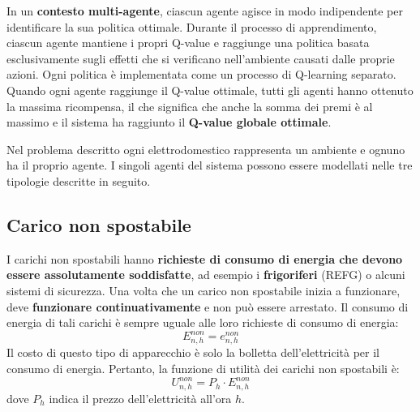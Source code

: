 \documentclass[italian, Lau, oneside]{sapthesis}
\begin{document}
In un \textbf{contesto multi-agente}, ciascun agente agisce in modo indipendente per identificare la sua politica ottimale. Durante il processo di apprendimento, ciascun agente mantiene i propri Q-value e raggiunge una politica basata esclusivamente sugli effetti che si verificano nell'ambiente causati dalle proprie azioni. Ogni politica è implementata come un processo di Q-learning separato. Quando ogni agente raggiunge il Q-value ottimale, tutti gli agenti hanno ottenuto la massima ricompensa, il che significa che anche la somma dei premi è al massimo e il sistema ha raggiunto il \textbf{Q-value globale ottimale}.

Nel problema descritto ogni elettrodomestico rappresenta un ambiente e ognuno ha il proprio agente. I singoli agenti del sistema possono essere modellati nelle tre tipologie descritte in seguito.

\subsection{Carico non spostabile}
I carichi non spostabili hanno \textbf{richieste di consumo di energia che devono essere assolutamente soddisfatte}, ad esempio i \textbf{frigoriferi} (REFG) o alcuni sistemi di sicurezza. Una volta che un carico non spostabile inizia a funzionare, deve \textbf{funzionare continuativamente} e non può essere arrestato. Il consumo di energia di tali carichi è sempre uguale alle loro richieste di consumo di energia:
\begin{equation}
    E^{non}_{n,h} = e^{non}_{n,h}
\end{equation}
Il costo di questo tipo di apparecchio è solo la bolletta dell’elettricità per il consumo di energia. Pertanto, la funzione di utilità dei carichi non spostabili è:
\begin{equation}
    U^{non}_{n,h} = P_h \cdot E^{non}_{n,h}
\end{equation}
dove $P_h$ indica il prezzo dell'elettricità all'ora $h$.
\end{document}
